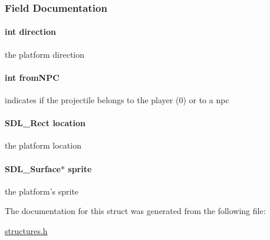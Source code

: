 \subsubsection{Field Documentation}
\hypertarget{structprojectile_a886d551d5381dc3e53f17825ffc51641}{
\paragraph[{direction}]{\setlength{\rightskip}{0pt plus 5cm}int direction}}\label{structprojectile_a886d551d5381dc3e53f17825ffc51641}
the platform direction \hypertarget{structprojectile_a130dff78b354d57d5b6dadcad3e597ef}{
\paragraph[{from\-N\-P\-C}]{\setlength{\rightskip}{0pt plus 5cm}int from\-N\-P\-C}}\label{structprojectile_a130dff78b354d57d5b6dadcad3e597ef}
indicates if the projectile belongs to the player (0) or to a npc \hypertarget{structprojectile_a08e7ab1c2395b84bea7ca13eb99bac60}{
\paragraph[{location}]{\setlength{\rightskip}{0pt plus 5cm}S\-D\-L\-\_\-\-Rect location}}\label{structprojectile_a08e7ab1c2395b84bea7ca13eb99bac60}
the platform location \hypertarget{structprojectile_a1c7252614a33238e51edd3bbd5fa08c5}{
\paragraph[{sprite}]{\setlength{\rightskip}{0pt plus 5cm}S\-D\-L\-\_\-\-Surface$\ast$ sprite}}\label{structprojectile_a1c7252614a33238e51edd3bbd5fa08c5}
the platform's sprite 

The documentation for this struct was generated from the following file\-:\begin{DoxyCompactItemize}
\item 
\hyperlink{structures_8h}{structures.\-h}\end{DoxyCompactItemize}
